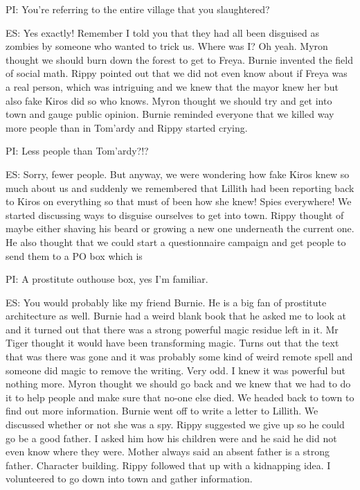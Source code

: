 PI: You’re referring to the entire village that you slaughtered?\medskip

ES: Yes exactly! Remember I told you that they had all been disguised as zombies by someone who wanted to trick us. Where was I? Oh yeah. Myron thought we should burn down the forest to get to Freya. Burnie invented the field of social math. Rippy pointed out that we did not even know about if Freya was a real person, which was intriguing and we knew that the mayor knew her but also fake Kiros did so who knows. Myron thought we should try and get into town and gauge public opinion. Burnie reminded everyone that we killed way more people than in Tom’ardy and Rippy started crying.\medskip

PI: Less people than Tom’ardy?!?\medskip

ES: Sorry, fewer people. But anyway, we were wondering how fake Kiros knew so much about us and suddenly we remembered that Lillith had been reporting back to Kiros on everything so that must of been how she knew! Spies everywhere! We started discussing ways to disguise ourselves to get into town. Rippy thought of maybe either shaving his beard or growing a new one underneath the current one. He also thought that we could start a questionnaire campaign and get people to send them to a PO box which is\medskip

PI: A prostitute outhouse box, yes I’m familiar.\medskip

ES: You would probably like my friend Burnie. He is a big fan of prostitute architecture as well. Burnie had a weird blank book that he asked me to look at and it turned out that there was a strong powerful magic residue left in it. Mr Tiger thought it would have been transforming magic. Turns out that the text that was there was gone and it was probably some kind of weird remote spell and someone did magic to remove the writing. Very odd. I knew it was powerful but nothing more. Myron thought we should go back and we knew that we had to do it to help people and make sure that no-one else died. We headed back to town to find out more information. Burnie went off to write a letter to Lillith. We discussed whether or not she was a spy. Rippy suggested we give up so he could go be a good father. I asked him how his children were and he said he did not even know where they were. Mother always said an absent father is a strong father. Character building. Rippy followed that up with a kidnapping idea. I volunteered to go down into town and gather information.\medskip

